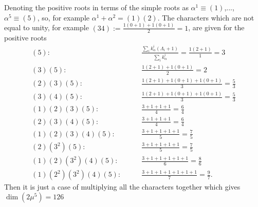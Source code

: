 \documentclass[main.tex]{subfiles}
\begin{document}
Denoting the positive roots in terms of the simple roots as $\alpha^1\equiv(1)$,..., $\alpha^5\equiv(5)$, so, for example $\alpha^1+\alpha^2=(1)(2)$. The characters which are not equal to unity, for example $(34):=\frac{1(0+1)+1(0+1)}{2}=1$, are given for the positive roots
\begin{align}
(5):&\qquad  \frac{\sum_ik^i_{\alpha}(\Lambda_i+1)}{\sum_ik^i_{\alpha}}=\frac{1(2+1)}{1}=3\\
(3)(5):&\qquad \frac{1(2+1)+1(0+1)}{2}=2\\
(2)(3)(5):&\qquad \frac{1(2+1)+1(0+1)+1(0+1)}{3}=\frac{5}{3}\\
(3)(4)(5):&\qquad \frac{1(2+1)+1(0+1)+1(0+1)}{3}=\frac{5}{3}\\
(1)(2)(3)(5):&\qquad \frac{3+1+1+1}{4}=\frac{6}{4}\\
(2)(3)(4)(5):&\qquad \frac{3+1+1+1}{4}=\frac{6}{4}\\
(1)(2)(3)(4)(5):&\qquad \frac{3+1+1+1+1}{5}=\frac{7}{5}\\
(2)(3^2)(5):&\qquad \frac{3+1+1+1+1}{5}=\frac{7}{5}\\
(1)(2)(3^2)(4)(5):&\qquad \frac{3+1+1+1+1+1}{6}=\frac{8}{6}\\
(1)(2^2)(3^2)(4)(5):&\qquad \frac{3+1+1+1+1+1+1}{7}=\frac{9}{7}.
\end{align}
Then it is just a case of multiplying all the characters together which gives $\dim{(2\mu^5)}=126$
\end{document}

